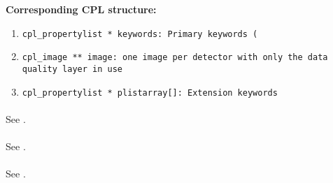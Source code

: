 \begin{datastructdef}
\textbf{Corresponding \ac{CPL} structure:}
\begin{enumerate}
 \item \texttt{cpl\_propertylist * keywords: Primary keywords (}
    \item \texttt{cpl\_image ** image: one image per detector with only the data quality layer in use}
    \item \texttt{cpl\_propertylist * plistarray[]: Extension keywords}
\end{enumerate}
\end{datastructdef}

\paragraph{}\label{dataitem:badpix_map_2rg}
See .

\paragraph{}\label{dataitem:badpix_map_geo}
See .

\paragraph{}\label{dataitem:badpix_map_ifu}
See .

